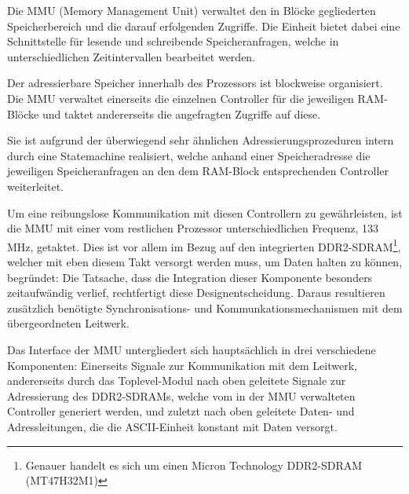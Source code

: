 \label{ch:mmu}

Die MMU (Memory Management Unit) verwaltet den in Bl\"ocke gegliederten Speicherbereich und die darauf erfolgenden Zugriffe. Die Einheit bietet dabei eine Schnittstelle f\"ur lesende und schreibende Speicheranfragen, welche in unterschiedlichen Zeitintervallen bearbeitet werden.


Der adressierbare Speicher innerhalb des Prozessors ist blockweise organisiert. Die MMU verwaltet einerseits die einzelnen Controller f\"ur die jeweiligen RAM-Bl\"ocke und taktet andererseits die angefragten Zugriffe auf diese.

Sie ist aufgrund der \"uberwiegend sehr \"ahnlichen Adressierungsprozeduren intern durch eine Statemachine realisiert, welche anhand einer Speicheradresse die jeweiligen Speicheranfragen an den dem RAM-Block entsprechenden Controller weiterleitet.

Um eine reibungslose Kommunikation mit diesen Controllern zu gew\"ahrleisten, ist die MMU mit einer vom restlichen Prozessor unterschiedlichen Frequenz, 133 MHz, getaktet. Dies ist vor allem im Bezug auf den integrierten DDR2-SDRAM\footnote{Genauer handelt es sich um einen Micron Technology DDR2-SDRAM (MT47H32M1)}, welcher mit eben diesem Takt versorgt werden muss, um Daten halten zu k\"onnen, begr\"undet: Die Tatsache, dass die Integration dieser Komponente besonders zeitaufw\"andig verlief, rechtfertigt diese Designentscheidung. Daraus resultieren zus\"atzlich ben\"otigte Synchronisations- und Kommunkationsmechanismen mit dem \"ubergeordneten Leitwerk.

Das Interface der MMU untergliedert sich haupts\"achlich in drei verschiedene Komponenten: Einerseits Signale zur Kommunikation mit dem Leitwerk, andererseits durch das Toplevel-Modul nach oben geleitete Signale zur Adressierung des DDR2-SDRAMs, welche vom in der MMU verwalteten Controller generiert werden, und zuletzt nach oben geleitete Daten- und Adressleitungen, die die ASCII-Einheit konstant mit Daten versorgt.

